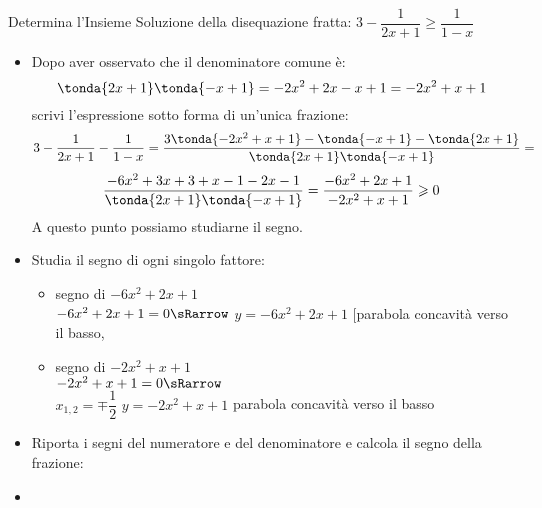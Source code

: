 \begin{esempio}{}{}
Determina l'Insieme Soluzione della disequazione fratta:\quad 
\(3-\dfrac{1}{2x+1} \geqslant \dfrac{1}{1-x}\)

\begin{itemize}

\item Dopo aver osservato che il denominatore comune è:
\[\tonda{2x+1}\tonda{-x+1} = -2x^2 +2x -x +1 = -2x^2 +x +1\]
scrivi l'espressione sotto forma di un'unica frazione:
\[3-\dfrac{1}{2x+1} - \dfrac{1}{1-x} =
  \dfrac{3 \tonda{-2x^2 +x +1} - \tonda{-x+1} - \tonda{2x+1}}
        {\tonda{2x+1}\tonda{-x+1}} =\]
\[\dfrac{-6x^2 +3x +3 +x-1 -2x-1}
        {\tonda{2x+1}\tonda{-x+1}} = 
  \dfrac{-6x^2 +2x +1}
        {-2x^2 +x +1} \geqslant 0\]
A questo punto possiamo studiarne il segno.

 \item Studia il segno di ogni singolo fattore:

\begin{itemize}

 \item  segno di \(-6x^2 +2x +1\)\\
 \segnofatt
   {\(-6x^2 +2x +1=0 \sRarrow\)}
   {\(y=-6x^2 +2x +1\)}
   {[parabola concavità verso il basso, }
   {}
 \item segno di \(-2x^2 +x +1\)\\
 \segnofatt
   {\(-2x^2 +x +1=0 \sRarrow \) \\
  \(x_{1,2}=\mp\dfrac{1}{2}\)}
   {\(y=-2x^2 +x +1\)}
   {parabola concavità verso il basso}
   {\parabolaamidma{}{}}
\end{itemize}

 \item Riporta i segni del numeratore e del denominatore e calcola
il segno della frazione:

\begin{inaccessibleblock}
\vspace{2em}
  \begin{center}
  \segnofrazionec
  \end{center}
\end{inaccessibleblock}

 \item 
\end{itemize}
\end{esempio}

% 

